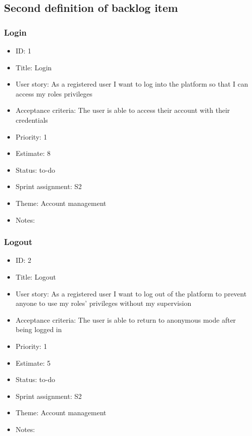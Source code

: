 \subsection{Second definition of backlog item}

\subsubsection{Login}
\begin{itemize}
	\item ID: 1
	\item Title: Login
	\item User story: As a registered user I want to log into the platform so that I can access my roles privileges
	\item Acceptance criteria: The user is able to access their account with their credentials
	\item Priority: 1
	\item Estimate: 8
	\item Status: to-do
	\item Sprint assignment: S2
	\item Theme: Account management
	\item Notes:
\end{itemize}

\subsubsection{Logout}
\begin{itemize}
	\item ID: 2
	\item Title: Logout
	\item User story: As a registered user I want to log out of the platform to prevent anyone to use my roles’ privileges without my supervision
	\item Acceptance criteria: The user is able to return to anonymous mode after being logged in
	\item Priority: 1
	\item Estimate: 5
	\item Status: to-do
	\item Sprint assignment: S2
	\item Theme: Account management
	\item Notes:
\end{itemize}


